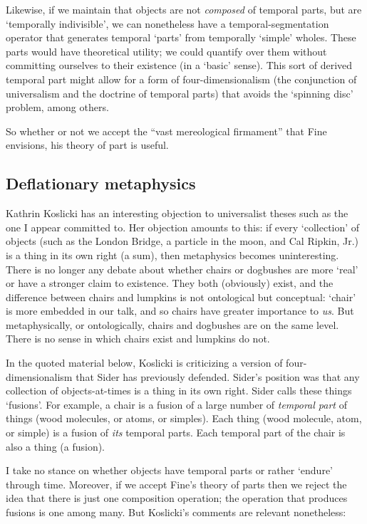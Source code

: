 \documentclass[11pt]{article}
\begin{document}
\begin{spacing}{1.5}
Likewise, if we maintain that objects are not {\em composed} of
temporal parts, but are `temporally indivisible', we can nonetheless
have a temporal-segmentation operator that generates temporal `parts'
from temporally `simple' wholes.  These parts would have theoretical
utility; we could quantify over them without committing ourselves to
their existence (in a `basic' sense).  This sort of derived temporal
part might allow for a form of four-dimensionalism (the conjunction of
universalism and the doctrine of temporal parts) that avoids the
`spinning disc' problem, among others.

So whether or not we accept the ``vast mereological firmament'' that
Fine envisions, his theory of part is useful.

\subsection{Deflationary metaphysics}
\label{deflate}
Kathrin Koslicki has an interesting objection to universalist theses
such as the one I appear committed to.  Her objection amounts to this:
if every `collection' of objects (such as the London Bridge, a
particle in the moon, and Cal Ripkin, Jr.) is a thing in its own right
(a sum), then metaphysics becomes uninteresting.  There is no longer
any debate about whether chairs or dogbushes are more `real' or have a
stronger claim to existence.  They both (obviously) exist, and the
difference between chairs and lumpkins is not ontological but
conceptual: `chair' is more embedded in our talk, and so chairs have
greater importance to {\em us}.  But metaphysically, or ontologically,
chairs and dogbushes are on the same level.  There is no sense in
which chairs exist and lumpkins do not.

In the quoted material below, Koslicki is criticizing a version of
four-dimensionalism that Sider has previously defended.  Sider's
position was that any collection of objects-at-times is a thing in its
own right.  Sider calls these things `fusions'.  For example, a chair
is a fusion of a large number of {\em temporal part} of things (wood
molecules, or atoms, or simples).  Each thing (wood molecule, atom, or
simple) is a fusion of {\em its} temporal parts.  Each temporal part
of the chair is also a thing (a fusion).

I take no stance on whether objects have temporal parts or rather
`endure' through time.  Moreover, if we accept Fine's theory of parts
then we reject the idea that there is just one composition operation;
the operation that produces fusions is one among many.  But Koslicki's
comments are relevant nonetheless:


\end{spacing}
\end{document}
